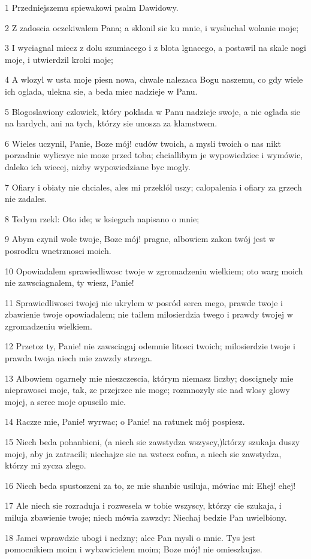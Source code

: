 \par 1 Przedniejszemu spiewakowi psalm Dawidowy.
\par 2 Z zadoscia oczekiwalem Pana; a sklonil sie ku mnie, i wysluchal wolanie moje;
\par 3 I wyciagnal miecz z dolu szumiacego i z blota lgnacego, a postawil na skale nogi moje, i utwierdzil kroki moje;
\par 4 A wlozyl w usta moje piesn nowa, chwale nalezaca Bogu naszemu, co gdy wiele ich oglada, ulekna sie, a beda miec nadzieje w Panu.
\par 5 Blogoslawiony czlowiek, który poklada w Panu nadzieje swoje, a nie oglada sie na hardych, ani na tych, którzy sie unosza za klamstwem.
\par 6 Wieles uczynil, Panie, Boze mój! cudów twoich, a mysli twoich o nas nikt porzadnie wyliczyc nie moze przed toba; chciallibym je wypowiedziec i wymówic, daleko ich wiecej, nizby wypowiedziane byc mogly.
\par 7 Ofiary i obiaty nie chciales, ales mi przeklól uszy; calopalenia i ofiary za grzech nie zadales.
\par 8 Tedym rzekl: Oto ide; w ksiegach napisano o mnie;
\par 9 Abym czynil wole twoje, Boze mój! pragne, albowiem zakon twój jest w posrodku wnetrznosci moich.
\par 10 Opowiadalem sprawiedliwosc twoje w zgromadzeniu wielkiem; oto warg moich nie zawsciagnalem, ty wiesz, Panie!
\par 11 Sprawiedliwosci twojej nie ukrylem w posród serca mego, prawde twoje i zbawienie twoje opowiadalem; nie tailem milosierdzia twego i prawdy twojej w zgromadzeniu wielkiem.
\par 12 Przetoz ty, Panie! nie zawsciagaj odemnie litosci twoich; milosierdzie twoje i prawda twoja niech mie zawzdy strzega.
\par 13 Albowiem ogarnely mie nieszczescia, którym niemasz liczby; doscignely mie nieprawosci moje, tak, ze przejrzec nie moge; rozmnozyly sie nad wlosy glowy mojej, a serce moje opuscilo mie.
\par 14 Raczze mie, Panie! wyrwac; o Panie! na ratunek mój pospiesz.
\par 15 Niech beda pohanbieni, (a niech sie zawstydza wszyscy,)którzy szukaja duszy mojej, aby ja zatracili; niechajze sie na wstecz cofna, a niech sie zawstydza, którzy mi zycza zlego.
\par 16 Niech beda spustoszeni za to, ze mie shanbic usiluja, mówiac mi: Ehej! ehej!
\par 17 Ale niech sie rozraduja i rozwesela w tobie wszyscy, którzy cie szukaja, i miluja zbawienie twoje; niech mówia zawzdy: Niechaj bedzie Pan uwielbiony.
\par 18 Jamci wprawdzie ubogi i nedzny; alec Pan mysli o mnie. Tys jest pomocnikiem moim i wybawicielem moim; Boze mój! nie omieszkujze.


